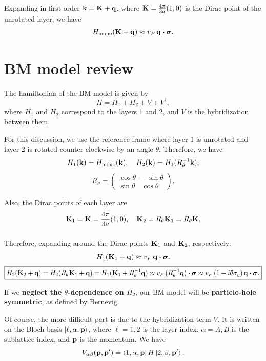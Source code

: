 Expanding in first-order ${\vb{k}} = {\vb{K}} + {\vb{q}}$, where ${\vb{K}} = \frac{4\pi}{3a} (1, 0)$ is the Dirac point of the unrotated layer, we have
$$
H_{\text{mono}}(\K + \q) \approx v_F \, \q \vdot \bm{\sigma}.
$$

\section{BM model review}

The hamiltonian of the BM model is given by
$$
H = H_1 + H_2 + V + V^\dagger,
$$
where $H_1$ and $H_2$ correspond to the layers 1 and 2, and $V$ is the hybridization between them.

\n

For this discussion, we use the reference frame where layer 1 is unrotated and layer 2 is rotated counter-clockwise by an angle $\theta$. Therefore, we have
$$
H_1({\vb{k}}) = H_{\text{mono}}({\vb{k}}), \quad H_2({\vb{k}}) = H_1(R_\theta^{-1}{\vb{k}}),
$$
$$
R_\theta =
\begin{pmatrix}
\cos\theta & -\sin\theta \\
\sin\theta & \cos\theta
\end{pmatrix}.
$$

Also, the Dirac points of each layer are
$$
{\vb{K}}_1 = {\vb{K}} = \frac{4\pi}{3a} (1, 0), \quad {\vb{K}}_2 = R_\theta {\vb{K}}_1 = R_\theta {\vb{K}},
$$
$$
$$

Therefore, expanding around the Dirac points ${\vb{K}}_1$ and ${\vb{K}}_2$, respectively:
$$
H_1(\K_1 + \q) \approx v_F \, \q \vdot \bm{\sigma}.
$$
$$
\boxed{ H_2(\K_2 + \q) = H_2(R_\theta \K_1 + \q) = H_1(\K_1 + R_\theta^{-1}\q) \approx v_F \, (R_\theta^{-1}\q) \vdot \bm{\sigma} \approx v_F \, (1 - i \theta \sigma_y ) \, \q \vdot \bm{\sigma}. }
$$

If we \textbf{neglect the $\theta$-dependence on $H_2$}, our BM model will be \textbf{particle-hole symmetric}, as defined by Bernevig.

\n

Of course, the more difficult part is due to the hybridization term $V$. It is written on the Bloch basis $\ket{\ell, \alpha, {\vb{p}}}$, where $\ell = 1, 2$ is the layer index, $\alpha = A, B$ is the sublattice index, and ${\vb{p}}$ is the momentum.
We have
$$
V_{\alpha\beta}({\vb{p}}, {\vb{p}}') = \bra{1, \alpha, {\vb{p}}} H \ket{2, \beta, {\vb{p}}'}.
$$

